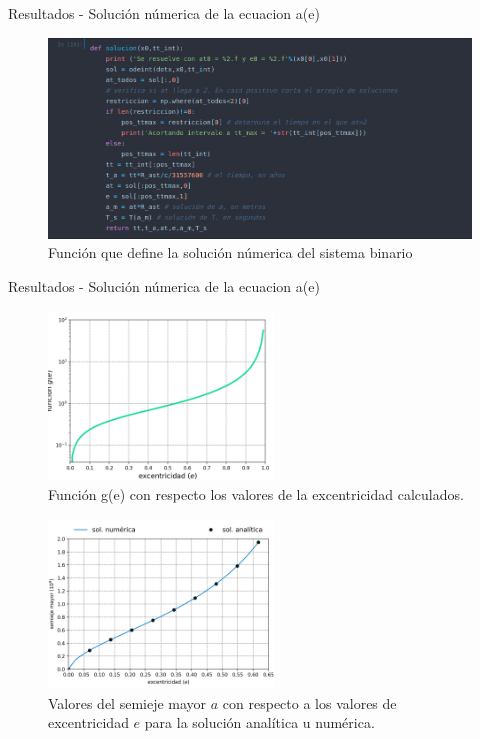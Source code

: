 \begin{frame}{Resultados - Solución númerica de la ecuacion a(e)}
    \begin{figure}[H]
        \includegraphics[scale=0.37]{images/solucion.png}
        \caption{Función que define la solución númerica del sistema binario}
    \end{figure}
\end{frame}
\begin{frame}{Resultados - Solución númerica de la ecuacion a(e)}
    \begin{minipage}{0.45\linewidth}
        \begin{figure}[H]
            \centering
            \includegraphics[height=4.5cm]{images/gvse.png}
            \caption{Función g(e) con respecto los valores de la excentricidad calculados.}
            \label{fig:gvse}
        \end{figure} 
    \end{minipage}
    \begin{minipage}{0.5\linewidth}
    \begin{figure}[H]
        \centering
        \includegraphics[height=4.5cm]{images/solana_solnum.png}
        \caption{Valores del semieje mayor $a$ con respecto a los valores de excentricidad $e$ para la solución analítica u numérica.}
        \label{fig:ananum}
    \end{figure}
    \end{minipage}
\end{frame}
